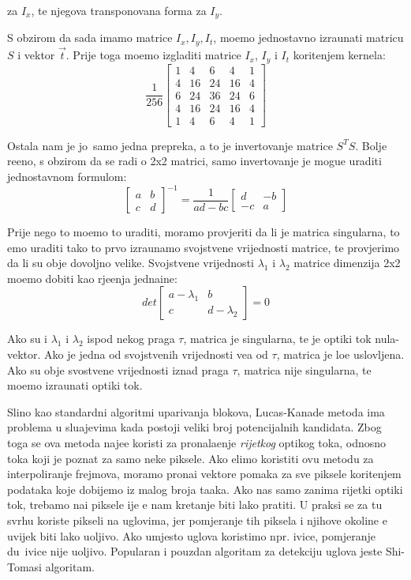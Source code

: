 za $I_x$, te njegova transponovana forma za $I_y$.

S obzirom da sada imamo matrice $I_x,I_y,I_t$, mo\zh emo jednostavno izra\ch unati matricu $S$ i vektor $\vec{t}$. Prije toga mo\zh emo izgladiti matrice $I_x$, $I_y$ i $I_t$ kori\sh tenjem kernela:
\[
\frac{1}{256}
\begin{bmatrix}
1 & 4 & 6 & 4 & 1 \\
4 & 16 & 24 & 16 & 4 \\
6 & 24 & 36 & 24 & 6 \\
4 & 16 & 24 & 16 & 4 \\
1 & 4 & 6 & 4 & 1
\end{bmatrix}
\]

Ostala nam je jo\sh\ samo jedna prepreka, a to je invertovanje matrice $S^TS$. Bolje re\ch eno, s obzirom da se radi o 2x2 matrici, samo invertovanje je mogu\cj e uraditi jednostavnom formulom:
\[
\begin{bmatrix}
a & b \\
c & d
\end{bmatrix}^{-1}
=\frac{1}{ad-bc}
\begin{bmatrix}
d & -b \\
-c & a
\end{bmatrix}
\]

Prije nego \sh to mo\zh emo to uraditi, moramo provjeriti da li je matrica singularna, \sh to \cj emo uraditi tako \sh to prvo izra\ch unamo svojstvene vrijednosti matrice, te provjerimo da li su obje
dovoljno velike. Svojstvene vrijednosti $\lambda_1$ i $\lambda_2$ matrice dimenzija 2x2 mo\zh emo dobiti kao rje\sh enja jedna\ch ine:
\[
det
\begin{bmatrix}
a-\lambda_1 & b \\
c & d-\lambda_2
\end{bmatrix}
=0
\]

Ako su i $\lambda_1$ i $\lambda_2$ ispod nekog praga $\tau$, matrica je singularna, te je opti\ch ki tok nula-vektor. Ako je jedna od svojstvenih vrijednosti ve\cj a od $\tau$, matrica je lo\sh e uslovljena. 
Ako su obje svostvene vrijednosti iznad praga $\tau$, matrica nije singularna, te mo\zh emo izra\ch unati opti\ch ki tok.


Sli\ch no kao standardni algoritmi uparivanja blokova, Lucas-Kanade metoda ima problema u slu\ch ajevima kada postoji veliki broj potencijalnih kandidata. Zbog toga se ova metoda naj\ch e\sh \cj e koristi
za pronala\zh enje \textit{rijetkog} opti\ch kog toka, odnosno toka koji je poznat za samo neke piksele. Ako \zh elimo koristiti ovu metodu za interpoliranje frejmova, moramo prona\cj i vektore pomaka za sve
piksele kori\sh tenjem podataka koje dobijemo iz malog broja ta\ch aka. 
Ako nas samo zanima rijetki opti\ch ki tok, trebamo na\cj i piksele \ch ije \cj e nam kretanje biti lako pratiti. U praksi se za tu svrhu koriste pikseli na uglovima, jer pomjeranje tih piksela i njihove okoline
\cj e uvijek biti lako uo\ch ljivo. Ako umjesto uglova koristimo npr. ivice, pomjeranje du\zh\ ivice nije uo\ch ljivo. Popularan i pouzdan algoritam za detekciju uglova jeste Shi-Tomasi algoritam.